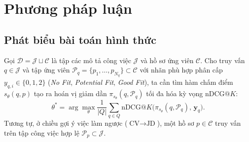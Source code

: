 \section{Phương pháp luận}

\subsection{Phát biểu bài toán hình thức}
Gọi $\mathcal{D} = \mathcal{J} \sqcup \mathcal{C}$ là tập các mô tả công việc $\mathcal{J}$ và hồ sơ ứng viên $\mathcal{C}$. Cho truy vấn $q \in \mathcal{J}$ và tập ứng viên $\mathcal{P}_q = \{p_1, \dots, p_{N_q}\} \subset \mathcal{C}$ với nhãn phù hợp phân cấp $y_{q,i} \in \{0, 1, 2\}$ (\textit{No Fit}, \textit{Potential Fit}, \textit{Good Fit}), ta cần tìm hàm chấm điểm $s_\theta(q, p)$ tạo ra hoán vị giảm dần $\pi_{s_\theta}(q, \mathcal{P}_q)$ tối đa hóa kỳ vọng $\text{nDCG}@K$:
\begin{equation}
    \theta^* = \arg\max_\theta \frac{1}{|Q|} \sum_{q \in Q} \text{nDCG}@K\Big( \pi_{s_\theta}(q, \mathcal{P}_q), \, \mathbf{y}_q \Big).
    \label{eq:objective}
\end{equation}
Tương tự, ở chiều gợi ý việc làm ngược ($\text{CV} \rightarrow \text{JD}$), một hồ sơ $p \in \mathcal{C}$ truy vấn trên tập công việc hợp lệ $\mathcal{P}_p \subset \mathcal{J}$.


